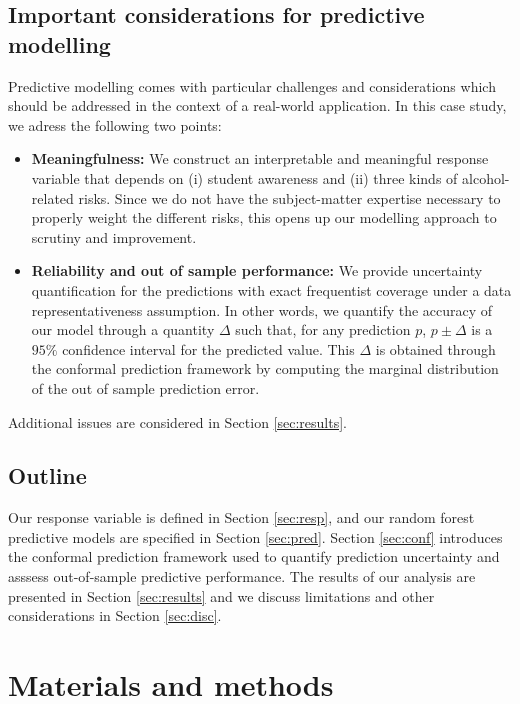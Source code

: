 \documentclass[10pt]{amsart}%
\begin{document}
\subsection{Important considerations for predictive modelling}

Predictive modelling comes with particular challenges and considerations which should be addressed in the context of a real-world application. In this case study, we adress the following two points:

\begin{itemize}
\item \textbf{Meaningfulness:} We construct an interpretable and meaningful response variable that depends on (i) student awareness and (ii) three kinds of alcohol-related risks. Since we do not have the subject-matter expertise necessary to properly weight the different risks, this opens up our modelling approach to scrutiny and improvement.
\item \textbf{Reliability and out of sample performance:} We provide uncertainty quantification for the predictions with exact frequentist coverage under a data representativeness assumption. In other words, we quantify the accuracy of our model through a quantity $\Delta$ such that, for any prediction $p$, $p \pm \Delta$ is a $95\%$ confidence interval for the predicted value. This $\Delta$ is obtained through the conformal prediction framework \cite{Vovk.2005} by computing the marginal distribution of the out of sample prediction error. 
\end{itemize}

Additional issues are considered in Section \ref{sec:results}.

\subsection{Outline}

Our response variable is defined in Section \ref{sec:resp}, and our random forest predictive models are specified in Section \ref{sec:pred}. Section \ref{sec:conf} introduces the conformal prediction framework used to quantify prediction uncertainty and asssess out-of-sample predictive performance. The results of our analysis are presented in Section \ref{sec:results} and we discuss limitations and other considerations in Section \ref{sec:disc}.



\section{Materials and methods}
\end{document}
